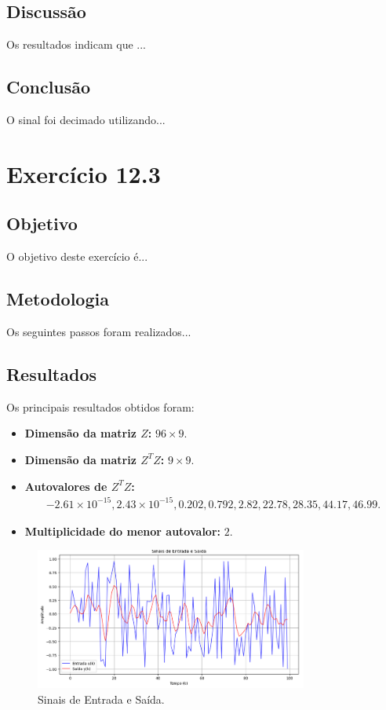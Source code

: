 \documentclass[12pt,a4paper]{article}
\begin{document}
\subsection{Discussão}

Os resultados indicam que ...

\subsection{Conclusão}

O sinal foi decimado utilizando...

\section{Exercício 12.3}

\subsection{Objetivo}
O objetivo deste exercício é...

\subsection{Metodologia}

Os seguintes passos foram realizados... 

\subsection{Resultados}

Os principais resultados obtidos foram:

\begin{itemize}
\item \textbf{Dimensão da matriz $Z$:} $96 \times 9$.
\item \textbf{Dimensão da matriz $Z^T Z$:} $9 \times 9$.
\item \textbf{Autovalores de $Z^T Z$:}
\begin{align*}
{-2.61 \times 10^{-15}, 2.43 \times 10^{-15}, 0.202, 0.792, 2.82, 22.78, 28.35, 44.17, 46.99}.
\end{align*}
\item \textbf{Multiplicidade do menor autovalor:} $2$.
\end{itemize}

\begin{figure}[h]
\centering
\includegraphics[width=0.8\textwidth]{12_3.png}
\caption{Sinais de Entrada e Saída.}
\label{fig:Sinais de Entrada e Saída}
\end{figure}
\end{document}
